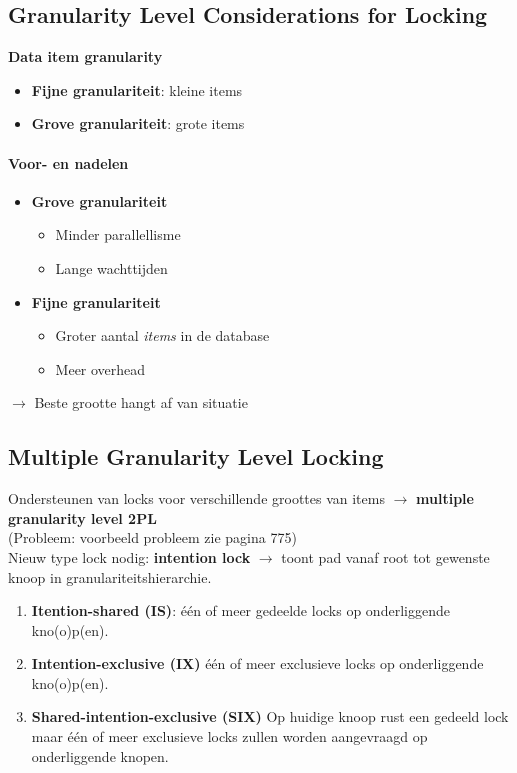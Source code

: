 \subsection{Granularity Level Considerations for Locking}%
\textbf{Data item granularity}
\begin{itemize}
	\item \textbf{Fijne granulariteit}: kleine items
	\item \textbf{Grove granulariteit}: grote items 
\end{itemize}
\paragraph{Voor- en nadelen}
\begin{itemize}
	\item \textbf{Grove granulariteit}
	\begin{itemize}
		\item Minder parallellisme
		\item Lange wachttijden
	\end{itemize}
	\item \textbf{Fijne granulariteit}
	\begin{itemize}
		\item Groter aantal \textit{items} in de database
		\item Meer overhead
	\end{itemize}
\end{itemize}
$\rightarrow$ Beste grootte hangt af van situatie


\subsection{Multiple Granularity Level Locking}%
Ondersteunen van locks voor verschillende groottes van items $\rightarrow$ \textbf{multiple granularity level 2PL}\\
(Probleem: voorbeeld probleem zie pagina 775) \\
Nieuw type lock nodig: \textbf{intention lock} $\rightarrow$ toont pad vanaf root tot gewenste knoop in granulariteitshierarchie.
\begin{enumerate}
	\item \textbf{Itention-shared (IS)}: \'e\'en of meer gedeelde locks op onderliggende kno(o)p(en).
	\item \textbf{Intention-exclusive (IX)} \'e\'en of meer exclusieve locks op onderliggende kno(o)p(en).
	\item \textbf{Shared-intention-exclusive (SIX)} Op huidige knoop rust een gedeeld lock maar \'e\'en of meer exclusieve locks zullen worden aangevraagd op onderliggende knopen.
\end{enumerate}
